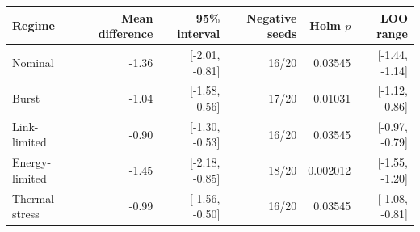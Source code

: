 \begin{tabular}{lrrrrr}
\toprule
Regime & Mean difference & 95\% interval & Negative seeds & Holm $p$ & LOO range \\
\midrule
Nominal & -1.36 & [-2.01, -0.81] & 16/20 & 0.03545 & [-1.44, -1.14] \\
Burst & -1.04 & [-1.58, -0.56] & 17/20 & 0.01031 & [-1.12, -0.86] \\
Link-limited & -0.90 & [-1.30, -0.53] & 16/20 & 0.03545 & [-0.97, -0.79] \\
Energy-limited & -1.45 & [-2.18, -0.85] & 18/20 & 0.002012 & [-1.55, -1.20] \\
Thermal-stress & -0.99 & [-1.56, -0.50] & 16/20 & 0.03545 & [-1.08, -0.81] \\
\bottomrule
\end{tabular}